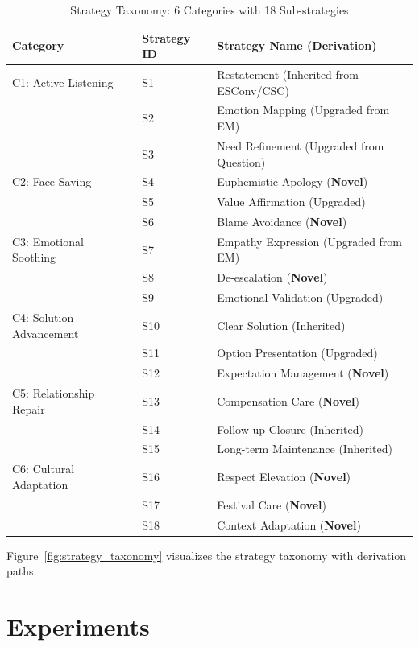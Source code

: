 \documentclass[11pt]{article}
\begin{document}
\begin{table}[t]
  \centering
  \caption{Strategy Taxonomy: 6 Categories with 18 Sub-strategies}
  \label{tab:strategies}
  \small
  \begin{tabularx}{\textwidth}{l|l|X}
    \toprule
    Category & Strategy ID & Strategy Name (Derivation) \\
    \midrule
    C1: Active Listening & S1 & Restatement (Inherited from ESConv/CSC) \\
    & S2 & Emotion Mapping (Upgraded from EM) \\
    & S3 & Need Refinement (Upgraded from Question) \\
    \midrule
    C2: Face-Saving & S4 & Euphemistic Apology (\textbf{Novel}) \\
    & S5 & Value Affirmation (Upgraded) \\
    & S6 & Blame Avoidance (\textbf{Novel}) \\
    \midrule
    C3: Emotional Soothing & S7 & Empathy Expression (Upgraded from EM) \\
    & S8 & De-escalation (\textbf{Novel}) \\
    & S9 & Emotional Validation (Upgraded) \\
    \midrule
    C4: Solution Advancement & S10 & Clear Solution (Inherited) \\
    & S11 & Option Presentation (Upgraded) \\
    & S12 & Expectation Management (\textbf{Novel}) \\
    \midrule
    C5: Relationship Repair & S13 & Compensation Care (\textbf{Novel}) \\
    & S14 & Follow-up Closure (Inherited) \\
    & S15 & Long-term Maintenance (Inherited) \\
    \midrule
    C6: Cultural Adaptation & S16 & Respect Elevation (\textbf{Novel}) \\
    & S17 & Festival Care (\textbf{Novel}) \\
    & S18 & Context Adaptation (\textbf{Novel}) \\
    \bottomrule
  \end{tabularx}
\end{table}

Figure~\ref{fig:strategy_taxonomy} visualizes the strategy taxonomy with derivation paths.




\section{Experiments}
\end{document}

